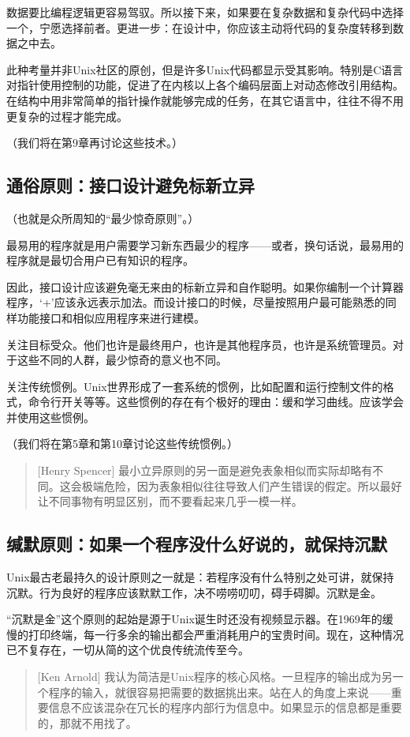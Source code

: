 \documentclass[11pt,oneside]{book}
\begin{document}
\begin{common-format}
数据要比编程逻辑更容易驾驭。所以接下来，如果要在复杂数据和复杂代码中选择一个，宁愿选择前者。更进一步：在设计中，你应该主动将代码的复杂度转移到数据之中去。

此种考量并非Unix社区的原创，但是许多Unix代码都显示受其影响。特别是C语言对指针使用控制的功能，促进了在内核以上各个编码层面上对动态修改引用结构。在结构中用非常简单的指针操作就能够完成的任务，在其它语言中，往往不得不用更复杂的过程才能完成。

（我们将在第9章再讨论这些技术。）

\subsection{通俗原则：接口设计避免标新立异}
（也就是众所周知的“最少惊奇原则”。）

最易用的程序就是用户需要学习新东西最少的程序——或者，换句话说，最易用的程序就是最切合用户已有知识的程序。

因此，接口设计应该避免毫无来由的标新立异和自作聪明。如果你编制一个计算器程序，‘+’应该永远表示加法。而设计接口的时候，尽量按照用户最可能熟悉的同样功能接口和相似应用程序来进行建模。

关注目标受众。他们也许是最终用户，也许是其他程序员，也许是系统管理员。对于这些不同的人群，最少惊奇的意义也不同。

关注传统惯例。Unix世界形成了一套系统的惯例，比如配置和运行控制文件的格式，命令行开关等等。这些惯例的存在有个极好的理由：缓和学习曲线。应该学会并使用这些惯例。

（我们将在第5章和第10章讨论这些传统惯例。）

\begin{quote}[Henry Spencer]
最小立异原则的另一面是避免表象相似而实际却略有不同。这会极端危险，因为表象相似往往导致人们产生错误的假定。所以最好让不同事物有明显区别，而不要看起来几乎一模一样。
\end{quote}


\subsection{缄默原则：如果一个程序没什么好说的，就保持沉默}
Unix最古老最持久的设计原则之一就是：若程序没有什么特别之处可讲，就保持沉默。行为良好的程序应该默默工作，决不唠唠叨叨，碍手碍脚。沉默是金。

“沉默是金”这个原则的起始是源于Unix诞生时还没有视频显示器。在1969年的缓慢的打印终端，每一行多余的输出都会严重消耗用户的宝贵时间。现在，这种情况已不复存在，一切从简的这个优良传统流传至今。

\begin{quote}[Ken Arnold]
我认为简洁是Unix程序的核心风格。一旦程序的输出成为另一个程序的输入，就很容易把需要的数据挑出来。站在人的角度上来说——重要信息不应该混杂在冗长的程序内部行为信息中。如果显示的信息都是重要的，那就不用找了。
\end{quote}


\end{common-format}
\end{document}
